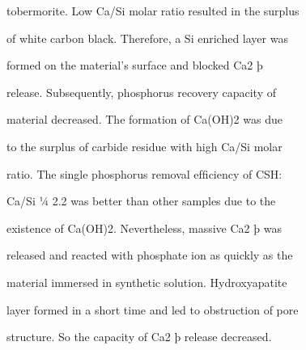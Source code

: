 \documentclass[a4paper,portrait,12pt]{article}
\begin{document}
\begin{flushleft}
tobermorite. Low Ca/Si molar ratio resulted in the surplus
\end{flushleft}


\begin{flushleft}
of white carbon black. Therefore, a Si enriched layer was
\end{flushleft}


\begin{flushleft}
formed on the material's surface and blocked Ca2 þ
\end{flushleft}


\begin{flushleft}
release. Subsequently, phosphorus recovery capacity of
\end{flushleft}


\begin{flushleft}
material decreased. The formation of Ca(OH)2 was due
\end{flushleft}


\begin{flushleft}
to the surplus of carbide residue with high Ca/Si molar
\end{flushleft}


\begin{flushleft}
ratio. The single phosphorus removal efﬁciency of CSH:
\end{flushleft}


\begin{flushleft}
Ca/Si ¼ 2.2 was better than other samples due to the
\end{flushleft}


\begin{flushleft}
existence of Ca(OH)2. Nevertheless, massive Ca2 þ was
\end{flushleft}


\begin{flushleft}
released and reacted with phosphate ion as quickly as the
\end{flushleft}


\begin{flushleft}
material immersed in synthetic solution. Hydroxyapatite
\end{flushleft}


\begin{flushleft}
layer formed in a short time and led to obstruction of pore
\end{flushleft}


\begin{flushleft}
structure. So the capacity of Ca2 þ release decreased.
\end{flushleft}
\end{document}
